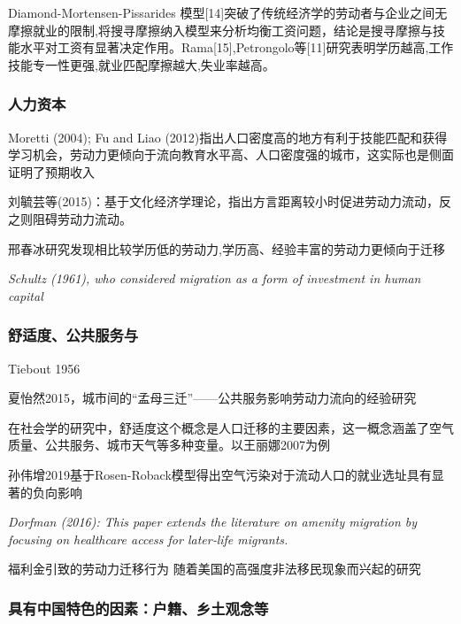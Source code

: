\documentclass[a4paper,10pt]{article}
\begin{document}
Diamond-Mortensen-Pissarides 模型[14]突破了传统经济学的劳动者与企业之间无摩擦就业的限制,将搜寻摩擦纳入模型来分析均衡工资问题，结论是搜寻摩擦与技能水平对工资有显著决定作用。Rama[15],Petrongolo等[11]研究表明学历越高,工作技能专一性更强,就业匹配摩擦越大,失业率越高。







\subsubsection{人力资本}

Moretti (2004); Fu and Liao (2012)指出人口密度高的地方有利于技能匹配和获得学习机会，劳动力更倾向于流向教育水平高、人口密度强的城市，这实际也是侧面证明了预期收入

刘毓芸等(2015)\cite{LiuYuYunLaoDongLiKuaFangYanLiuDongDeDaoUXingMoShi2015}：基于文化经济学理论，指出方言距离较小时促进劳动力流动，反之则阻碍劳动力流动。

邢春冰研究发现相比较学历低的劳动力,学历高、经验丰富的劳动力更倾向于迁移

\textit{Schultz (1961), who considered migration as a form of investment in human capital}

\subsubsection{舒适度、公共服务与}
Tiebout 1956

夏怡然2015，城市间的“孟母三迁”——公共服务影响劳动力流向的经验研究
\cite{XiaYiRanChengShiJianDeMengMuSanQianGongGongFuWuYingXiangLaoDongLiLiuXiangDeJingYanYanJiu2015}


在社会学的研究中，舒适度这个概念是人口迁移的主要因素，这一概念涵盖了空气质量、公共服务、城市天气等多种变量。以王丽娜2007为例

孙伟增2019基于Rosen-Roback模型得出空气污染对于流动人口的就业选址具有显著的负向影响
\cite{SunWeiZengKongQiWuRanYuLaoDongLiDeKongJianLiuDongJiYuLiuDongRenKouJiuYeXuanZhiXingWeiDeYanJiu2019}

\textit{Dorfman (2016): This paper extends the literature on amenity migration by focusing on healthcare access for later‐life migrants.}


福利金引致的劳动力迁移行为
\cite{benjaminImportingPoorWelfare2004}
\cite{mckinnishWelfareinducedMigrationState2007}
随着美国的高强度非法移民现象而兴起的研究

\subsubsection{具有中国特色的因素：户籍、乡土观念等}
\end{document}
